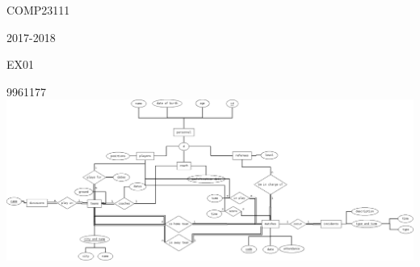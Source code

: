 \documentclass[a4paper]{article}
\begin{document}
COMP23111

2017-2018

EX01

9961177
\newpage
\includegraphics[scale=0.2]{Diagram1}
\end{document}
